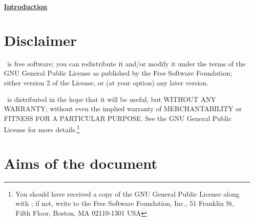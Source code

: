 %
%
%
%
%
%
%
%
\begin{center}
\underline{{\Huge \textbf{Introduction}}}
\end{center}

\vspace{1cm}

\section{Disclaimer}
\CS\ is free software; you can redistribute it
and/or modify it under the terms of the GNU General Public License
as published by the Free Software Foundation; either version 2 of
the License, or (at your option) any later version.

\CS\ is distributed in the hope that it will be
useful, but WITHOUT ANY WARRANTY; without even the implied warranty
of MERCHANTABILITY or FITNESS FOR A PARTICULAR PURPOSE.  See the
GNU General Public License for more details.\footnote{You should have
received a copy of the GNU General Public License
along with \CS; if not, write to the
Free Software Foundation, Inc.,
51 Franklin St, Fifth Floor,
Boston, MA  02110-1301  USA}

\section{Aims of the document}

